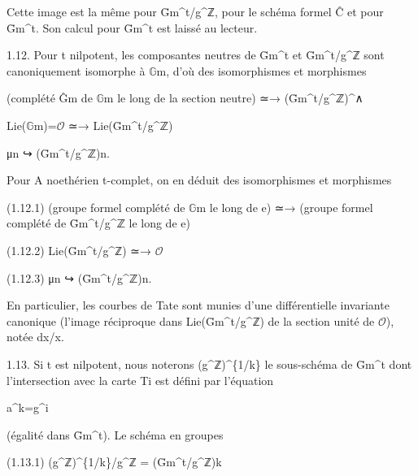 \documentclass[11pt,a4paper]{article}
\begin{document}
Cette image est la même pour Ḡ\textunderscore{}m\textasciicircum{}t/g\textasciicircum{}ℤ, pour le schéma formel Ĉ et pour Ḡ\textunderscore{}m\textasciicircum{}t. Son calcul pour Ḡ\textunderscore{}m\textasciicircum{}t est laissé au lecteur.

1.12. Pour t nilpotent, les composantes neutres de Ḡ\textunderscore{}m\textasciicircum{}t et Ḡ\textunderscore{}m\textasciicircum{}t/g\textasciicircum{}ℤ sont canoniquement isomorphe à \ensuremath{\mathbb{G}}\textunderscore{}m, d'où des isomorphismes et morphismes

(complété Ĝ\textunderscore{}m de \ensuremath{\mathbb{G}}\textunderscore{}m le long de la section neutre) ≃→ (Ḡ\textunderscore{}m\textasciicircum{}t/g\textasciicircum{}ℤ)\textasciicircum{}∧

Lie(\ensuremath{\mathbb{G}}\textunderscore{}m)=\ensuremath{\mathcal{O}} ≃→ Lie(Ḡ\textunderscore{}m\textasciicircum{}t/g\textasciicircum{}ℤ)

μ\textunderscore{}n ↪ (Ḡ\textunderscore{}m\textasciicircum{}t/g\textasciicircum{}ℤ)\textunderscore{}n.

Pour A noethérien t-complet, on en déduit des isomorphismes et morphismes

(1.12.1) (groupe formel complété de \ensuremath{\mathbb{G}}\textunderscore{}m le long de e) ≃→ (groupe formel complété de Ḡ\textunderscore{}m\textasciicircum{}t/g\textasciicircum{}ℤ le long de e)

(1.12.2) Lie(Ḡ\textunderscore{}m\textasciicircum{}t/g\textasciicircum{}ℤ) ≃→ \ensuremath{\mathcal{O}}

(1.12.3) μ\textunderscore{}n ↪ (Ḡ\textunderscore{}m\textasciicircum{}t/g\textasciicircum{}ℤ)\textunderscore{}n.

En particulier, les courbes de Tate sont munies d'une différentielle invariante canonique (l'image réciproque dans Lie(Ḡ\textunderscore{}m\textasciicircum{}t/g\textasciicircum{}ℤ) de la section unité de \ensuremath{\mathcal{O}}), notée dx/x.

1.13. Si t est nilpotent, nous noterons (g\textasciicircum{}ℤ)\textasciicircum{}\{1/k\} le sous-schéma de Ḡ\textunderscore{}m\textasciicircum{}t dont l'intersection avec la carte T\textunderscore{}i est défini par l'équation

a\textasciicircum{}k=g\textasciicircum{}i

(égalité dans Ḡ\textunderscore{}m\textasciicircum{}t). Le schéma en groupes

(1.13.1) (g\textasciicircum{}ℤ)\textasciicircum{}\{1/k\}/g\textasciicircum{}ℤ = (Ḡ\textunderscore{}m\textasciicircum{}t/g\textasciicircum{}ℤ)\textunderscore{}k
\end{document}
